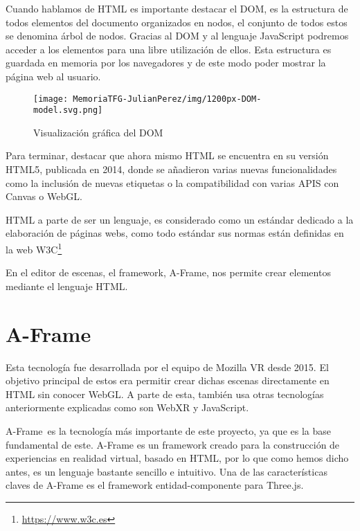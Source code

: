 \documentclass[a4paper, 12pt]{book}
\begin{document}
Cuando hablamos de HTML es importante destacar el DOM, es la estructura de todos elementos del documento organizados en nodos, el conjunto de todos estos se denomina árbol de nodos. Gracias al DOM y al lenguaje JavaScript podremos acceder a los elementos para una libre utilización de ellos. Esta estructura es guardada en memoria por los navegadores y de este modo poder mostrar la página web al usuario.


\begin{figure}[H]
  \centering
  \texttt{[image: MemoriaTFG-JulianPerez/img/1200px-DOM-model.svg.png]}
  \caption{Visualización gráfica del DOM}\label{html}
\end{figure}

Para terminar, destacar que ahora mismo HTML se encuentra en su versión HTML5, publicada en 2014, donde se añadieron varias nuevas funcionalidades como la inclusión de nuevas etiquetas o la compatibilidad con varias APIS con Canvas o WebGL.

HTML a parte de ser un lenguaje, es considerado como un estándar dedicado a la elaboración de páginas webs, como todo estándar sus normas están definidas en la web W3C\footnote{\url{https://www.w3c.es}}

En el editor de escenas, el framework, A-Frame, nos permite crear elementos mediante el lenguaje HTML.

\section{A-Frame} %
\label{sec:A-Frame}

Esta tecnología fue desarrollada por el equipo de Mozilla VR desde 2015. El objetivo principal de estos era permitir crear dichas escenas directamente en HTML sin conocer WebGL. A parte de esta, también usa otras tecnologías anteriormente explicadas como son WebXR y JavaScript.

A-Frame~\cite{aframe}es la tecnología más importante de este proyecto, ya que es la base fundamental de este. A-Frame es un framework creado para la construcción de experiencias en realidad virtual, basado en HTML, por lo que como hemos dicho antes, es un lenguaje bastante sencillo e intuitivo. Una de las características claves de A-Frame es el framework entidad-componente para Three.js.
\end{document}
